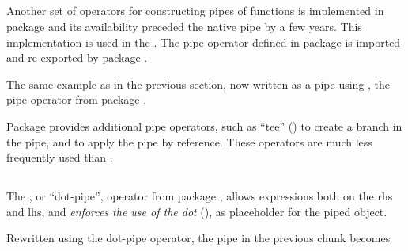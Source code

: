 \documentclass[krantz2]{krantz}\usepackage{knitr}
\begin{document}

\subsection{}
Another set of operators for constructing pipes of \Rlang functions is implemented in package  and its availability preceded the native \Rlang pipe by a few years. This implementation is used in the . The pipe operator defined in package  is imported and re-exported by package .

The same example as in the previous section, now written as a pipe using \Roperator{\%>\%}, the pipe operator from package .

\begin{knitrout}\footnotesize
{}\color{fgcolor}
\end{knitrout}

Package  provides additional pipe operators, such as ``tee'' () to create a branch in the pipe, and \Roperator{\%<>\%} to apply the pipe by reference. These operators are much less frequently used than \Roperator{\%>\%}.

\subsection{}
The , or ``dot-pipe'', operator from package , allows expressions both on the rhs and lhs, and \emph{enforces the use of the dot} (), as placeholder for the piped object.

Rewritten using the dot-pipe operator, the pipe in the previous chunk becomes

\begin{knitrout}\footnotesize
{}\color{fgcolor}
\end{knitrout}
\end{document}

